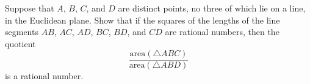 Suppose that $A$, $B$, $C$, and $D$ are distinct points, no three of which lie on a line, in the Euclidean plane. Show that if the squares of the lengths of the line segments $AB$, $AC$, $AD$, $BC$, $BD$, and $CD$ are rational numbers, then the quotient \[\frac{\mathrm{area}\left(\triangle{ABC}\right)}{\mathrm{area}\left(\triangle{ABD}\right)}\] is a rational number.